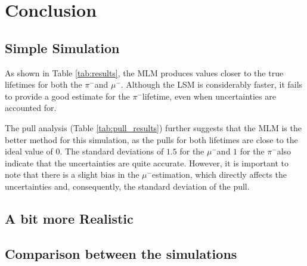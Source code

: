 \documentclass[11pt, a4paper, oneside]{book}
\newcommand{\pion}{$\pi^{-}$}
\newcommand{\muon}{$\mu^{-}$}
\begin{document}
\chapter{Conclusion}
\section{Simple Simulation}
As shown in Table \ref{tab:results}, the MLM produces values closer to the true lifetimes for both the \pion and \muon. Although the LSM is considerably faster, it fails to provide a good estimate for the \pion lifetime, even when uncertainties are accounted for.

The pull analysis (Table \ref{tab:pull_results}) further suggests that the MLM is the better method for this simulation, as the pulls for both lifetimes are close to the ideal value of 0. The standard deviations of $1.5$ for the \muon and $1$ for the \pion also indicate that the uncertainties are quite accurate. However, it is important to note that there is a slight bias in the \muon estimation, which directly affects the uncertainties and, consequently, the standard deviation of the pull.

\section{A bit more Realistic}
\section{Comparison between the simulations}


\end{document}
